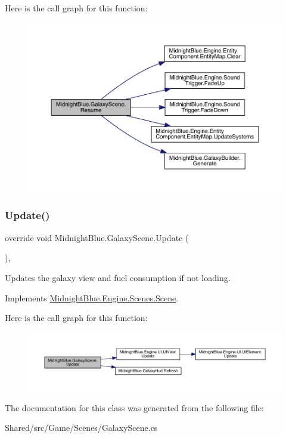 Here is the call graph for this function\+:
\nopagebreak
\begin{figure}[H]
\begin{center}
\leavevmode
\includegraphics[width=350pt]{class_midnight_blue_1_1_galaxy_scene_ab641e6727cdb64dc6487e9a229521692_cgraph}
\end{center}
\end{figure}
\hypertarget{class_midnight_blue_1_1_galaxy_scene_a9dfa66406143ed20f4d534c768f05a78}{}\label{class_midnight_blue_1_1_galaxy_scene_a9dfa66406143ed20f4d534c768f05a78} 
\subsubsection{\texorpdfstring{Update()}{Update()}}
{\footnotesize\ttfamily override void Midnight\+Blue.\+Galaxy\+Scene.\+Update (\begin{DoxyParamCaption}{ }\end{DoxyParamCaption})\hspace{0.3cm}{\ttfamily [inline]}, {\ttfamily [virtual]}}



Updates the galaxy view and fuel consumption if not loading. 



Implements \hyperlink{class_midnight_blue_1_1_engine_1_1_scenes_1_1_scene_a4e37ff3d5362a8ad5c0d82d7c990dfdf}{Midnight\+Blue.\+Engine.\+Scenes.\+Scene}.

Here is the call graph for this function\+:
\nopagebreak
\begin{figure}[H]
\begin{center}
\leavevmode
\includegraphics[width=350pt]{class_midnight_blue_1_1_galaxy_scene_a9dfa66406143ed20f4d534c768f05a78_cgraph}
\end{center}
\end{figure}


The documentation for this class was generated from the following file\+:\begin{DoxyCompactItemize}
\item 
Shared/src/\+Game/\+Scenes/Galaxy\+Scene.\+cs\end{DoxyCompactItemize}
